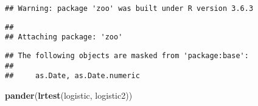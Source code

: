 \documentclass[]{article}
\newenvironment{Shaded}{\begin{snugshade}}{\end{snugshade}}
\newcommand{\KeywordTok}[1]{\textcolor[rgb]{0.13,0.29,0.53}{\textbf{#1}}}
\newcommand{\NormalTok}[1]{#1}
\begin{document}
\begin{verbatim}
## Warning: package 'zoo' was built under R version 3.6.3
\end{verbatim}

\begin{verbatim}
## 
## Attaching package: 'zoo'
\end{verbatim}

\begin{verbatim}
## The following objects are masked from 'package:base':
## 
##     as.Date, as.Date.numeric
\end{verbatim}

\begin{Shaded}
\begin{Highlighting}[]
\KeywordTok{pander}\NormalTok{(}\KeywordTok{lrtest}\NormalTok{(logistic, logistic2))}
\end{Highlighting}
\end{Shaded}
\end{document}

